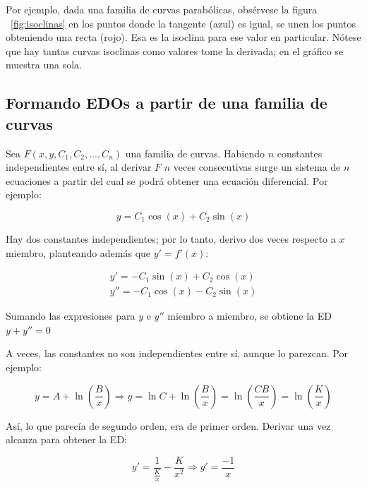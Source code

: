 \documentclass{article}
\begin{document}
Por ejemplo, dada una familia de curvas parabólicas, obsérvese la figura ~\ref{fig:isoclinas} en los puntos donde la tangente (azul) es igual, se unen los puntos obteniendo una recta (rojo). Esa es la isoclina para ese valor en particular. Nótese que hay tantas curvas isoclinas como valores tome la derivada; en el gráfico se muestra una sola.

\subsection{Formando EDOs a partir de una familia de curvas}

Sea $F(x, y, C_1, C_2, ..., C_n)$ una familia de curvas. Habiendo $n$ constantes independientes entre sí, al derivar $F$ $n$ veces consecutivas surge un sistema de $n$ ecuaciones a partir del cual se podrá obtener una ecuación diferencial. Por ejemplo:

\begin{equation}
y = C_1 \cos(x) + C_2 \sin(x)
\end{equation}

Hay dos constantes independientes; por lo tanto, derivo dos veces respecto a $x$ miembro, planteando además que $y' = f'(x)$:

\begin{subequations}
\begin{align}
y' = -C_1 \sin(x) + C_2 \cos(x) \\
y'' = -C_1 \cos(x) - C_2 \sin(x)
\end{align}
\end{subequations}

Sumando las expresiones para $y$ e $y''$ miembro a miembro, se obtiene la ED $y + y'' = 0$

A veces, las constantes no son independientes entre sí, aunque lo parezcan. Por ejemplo:

\begin{equation}
y = A + \ln \left( \frac{B}{x} \right) \Rightarrow y = \ln C + \ln \left( \frac{B}{x} \right) = \ln \left( \frac{C B}{x} \right) = \ln \left( \frac{K}{x} \right)
\end{equation}

Así, lo que parecía de segundo orden, era de primer orden. Derivar una vez alcanza para obtener la ED:

\begin{equation}
y' = \frac{1}{\frac{K}{x}} -\frac{K}{x^2} \Rightarrow y' = \frac{-1}{x}
\end{equation}
\end{document}
